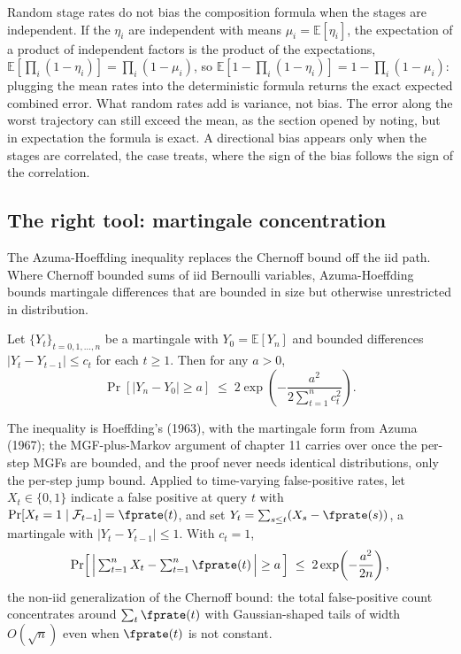 \begin{remark}
\label{rem:composition-unbiased}
Random stage rates do not bias the composition formula when the stages
are independent. If the $\eta_i$ are independent with means $\mu_i =
\mathbb{E}[\eta_i]$, the expectation of a product of independent factors
is the product of the expectations, $\mathbb{E}[\prod_i (1 - \eta_i)] =
\prod_i (1 - \mu_i)$, so $\mathbb{E}[1 - \prod_i (1 - \eta_i)] = 1 -
\prod_i (1 - \mu_i)$: plugging the mean rates into the deterministic
formula returns the exact expected combined error. What random rates add
is variance, not bias. The error along the worst trajectory can still
exceed the mean, as the section opened by noting, but in expectation the
formula is exact. A directional bias appears only when the stages are
correlated, the case  treats,
where the sign of the bias follows the sign of the correlation.
\end{remark}

\subsection*{The right tool: martingale concentration}

The Azuma-Hoeffding inequality replaces the Chernoff bound off the iid
path. Where Chernoff bounded sums of iid Bernoulli variables,
Azuma-Hoeffding bounds martingale differences that are bounded in size
but otherwise unrestricted in distribution.

\begin{proposition}
\label{prop:azuma-hoeffding}
Let $\{Y_t\}_{t = 0, 1, \ldots, n}$ be a martingale with $Y_0 = \mathbb{E}[Y_n]$
and bounded differences $|Y_t - Y_{t - 1}| \le c_t$ for each $t \ge 1$.
Then for any $a > 0$,
\[
  \Pr[|Y_n - Y_0| \ge a]
  \;\le\;
  2 \exp\!\left( -\frac{a^2}{2 \sum_{t = 1}^n c_t^2} \right).
\]
\end{proposition}

The inequality is Hoeffding's (1963), with the martingale form from Azuma
(1967); the MGF-plus-Markov argument of chapter 11 carries over once the
per-step MGFs are bounded, and the proof never needs identical
distributions, only the per-step jump bound. Applied to time-varying
false-positive rates, let $X_t \in \{0, 1\}$ indicate a false positive at
query $t$ with $\Pr[X_t = 1 \mid \mathcal{F}_{t-1}] = \fprate(t)$, and set
$Y_t = \sum_{s \le t} (X_s - \fprate(s))$, a martingale with $|Y_t -
Y_{t-1}| \le 1$. With $c_t = 1$,
\[
  \Pr\!\left[\,\Bigl|\,\textstyle\sum_{t=1}^n X_t - \sum_{t=1}^n \fprate(t)\,\Bigr| \ge a\,\right]
  \;\le\;
  2 \exp\!\left( -\frac{a^2}{2 n} \right),
\]
the non-iid generalization of the Chernoff bound: the total false-positive
count concentrates around $\sum_t \fprate(t)$ with Gaussian-shaped tails
of width $O(\sqrt{n})$ even when $\fprate(t)$ is not constant.

